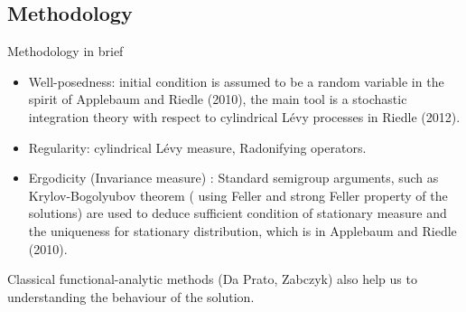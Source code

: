 \documentclass[xcolor=dvipsnames,leqno]{beamer}
\begin{document}
\begin{omitframe}   
\section[]{Methodology}
\begin{frame}[shrink]{Methodology in brief}
	\begin{itemize}      
		\item Well-posedness: initial condition is assumed to be a random variable in the spirit of Applebaum and Riedle (2010), the main tool is a stochastic integration theory with respect to cylindrical L\'evy processes in Riedle (2012).
		\item Regularity:   cylindrical L\'evy measure, Radonifying operators.
		\item Ergodicity (Invariance measure) : Standard semigroup arguments, such as Krylov-Bogolyubov theorem ( using Feller and strong Feller property of the solutions) are used to deduce sufficient condition of stationary measure and the uniqueness for stationary distribution, which is in Applebaum and Riedle (2010).
	\end{itemize} 
	Classical functional-analytic methods (Da Prato, Zabczyk) also help us to understanding the behaviour of the solution.
\end{frame}       
\end{omitframe}   
  
\end{document}
